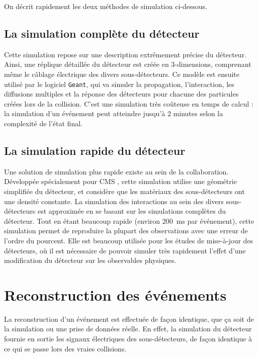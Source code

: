 On décrit rapidement les deux méthodes de simulation ci-dessous.

\subsection{La simulation complète du détecteur}

Cette simulation repose sur une description extrêmement précise du détecteur. Ainsi, une réplique détaillée du détecteur est créée en 3-dimensions, comprenant même le câblage électrique des divers sous-détecteurs. Ce modèle est ensuite utilisé par le logiciel \texttt{Geant}, qui va simuler la propagation, l'interaction, les diffusions multiples et la réponse des détecteurs pour chacune des particules créées lors de la collision. C'est une simulation très coûteuse en temps de calcul : la simulation d'un événement peut atteindre jusqu'à 2 minutes selon la complexité de l'état final.

\subsection{La simulation rapide du détecteur}

Une solution de simulation plus rapide existe au sein de la collaboration. Développée spécialement pour CMS \citep{1742-6596-219-3-032053}, cette simulation utilise une géométrie simplifiée du détecteur, et considère que les matériaux des sous-détecteurs ont une densité constante. La simulation des interactions au sein des divers sous-détecteurs est approximée en se basant sur les simulations complètes du détecteur. Tout en étant beaucoup rapide (environ \SI{200}{\ms} par événement), cette simulation permet de reproduire la plupart des observations avec une erreur de l'ordre du pourcent.  Elle est beaucoup utilisée pour les études de mise-à-jour des détecteurs, où il est nécessaire de pouvoir simuler très rapidement l'effet d'une modification du détecteur sur les observables physiques.

\section{Reconstruction des événements}

La reconstruction d'un événement est effectuée de façon identique, que ça soit de la simulation ou une prise de données réelle. En effet, la simulation du détecteur fournie en sortie les signaux électriques des sous-détecteurs, de façon identique à ce qui se passe lors des vraies collisions.

